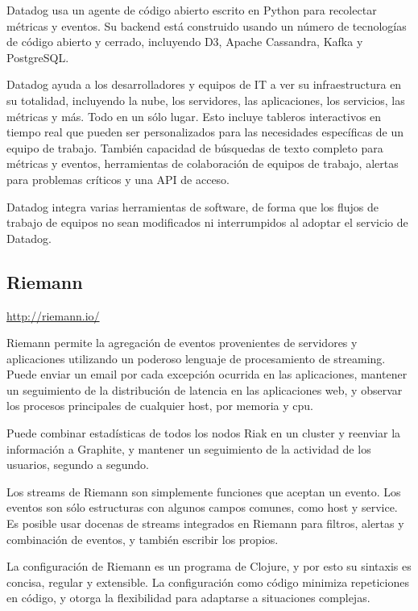 Datadog usa un agente de código abierto escrito en Python para recolectar métricas y eventos. Su backend está construido usando un número de tecnologías de código abierto y cerrado, incluyendo D3, Apache Cassandra, Kafka y PostgreSQL.

Datadog ayuda a los desarrolladores y equipos de IT a ver su infraestructura en su totalidad, incluyendo la nube, los servidores, las aplicaciones, los servicios, las métricas y más. Todo en un sólo lugar. Esto incluye tableros interactivos en tiempo real que pueden ser personalizados para las necesidades específicas de un equipo de trabajo. También capacidad de búsquedas de texto completo para métricas y eventos, herramientas de colaboración de equipos de trabajo, alertas para problemas críticos y una API de acceso.

Datadog integra varias herramientas de software, de forma que los flujos de trabajo de equipos no sean modificados ni interrumpidos al adoptar el servicio de Datadog.


\subsection{Riemann}

\url{http://riemann.io/}

Riemann permite la agregación de eventos provenientes de servidores y aplicaciones utilizando un poderoso lenguaje de procesamiento de streaming. Puede enviar un email por cada excepción ocurrida en las aplicaciones, mantener un seguimiento de la distribución de latencia en las aplicaciones web, y observar los procesos principales de cualquier host, por memoria y cpu.

Puede combinar estadísticas de todos los nodos Riak en un cluster y reenviar la información a Graphite, y mantener un seguimiento de la actividad de los usuarios, segundo a segundo.

Los streams de Riemann son simplemente funciones que aceptan un evento. Los eventos son sólo estructuras con algunos campos comunes, como host y service. Es posible usar docenas de streams integrados en Riemann para filtros, alertas y combinación de eventos, y también escribir los propios.

La configuración de Riemann es un programa de Clojure, y por esto su sintaxis es concisa, regular y extensible. La configuración como código minimiza repeticiones en código, y otorga la flexibilidad para adaptarse a situaciones complejas.

